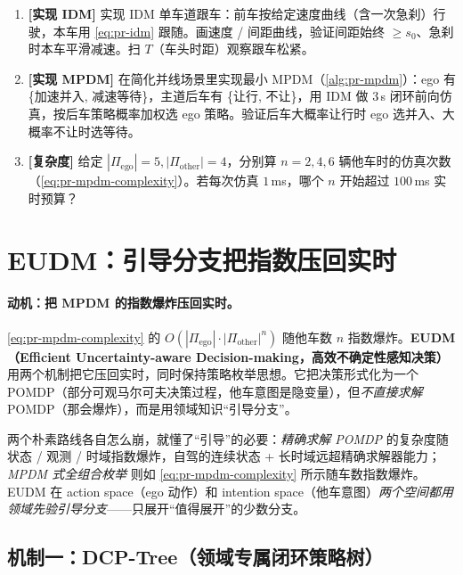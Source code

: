 \begin{practice}
\begin{enumerate}
  \item \textbf{[实现 IDM]} 实现 IDM 单车道跟车：前车按给定速度曲线（含一次急刹）行驶，本车用 \cref{eq:pr-idm} 跟随。画速度 / 间距曲线，验证间距始终 $\ge s_0$、急刹时本车平滑减速。扫 $T$（车头时距）观察跟车松紧。
  \item \textbf{[实现 MPDM]} 在简化并线场景里实现最小 MPDM（\cref{alg:pr-mpdm}）：ego 有 \{加速并入, 减速等待\}，主道后车有 \{让行, 不让\}，用 IDM 做 $3\,$s 闭环前向仿真，按后车策略概率加权选 ego 策略。验证后车大概率让行时 ego 选并入、大概率不让时选等待。
  \item \textbf{[复杂度]} 给定 $|\Pi_{\mathrm{ego}}|=5,|\Pi_{\mathrm{other}}|=4$，分别算 $n=2,4,6$ 辆他车时的仿真次数（\cref{eq:pr-mpdm-complexity}）。若每次仿真 $1\,$ms，哪个 $n$ 开始超过 $100\,$ms 实时预算？
\end{enumerate}
\end{practice}

\section{EUDM：引导分支把指数压回实时}
\label{sec:pr-eudm}

\paragraph{动机：把 MPDM 的指数爆炸压回实时。}
\cref{eq:pr-mpdm-complexity} 的 $O(|\Pi_{\mathrm{ego}}|\cdot|\Pi_{\mathrm{other}}|^n)$ 随他车数 $n$ 指数爆炸。\textbf{EUDM（Efficient Uncertainty-aware Decision-making，高效不确定性感知决策）}\cite{zhang2020eudm} 用两个机制把它压回实时，同时保持策略枚举思想。它把决策形式化为一个 POMDP（部分可观马尔可夫决策过程，他车意图是隐变量），但\emph{不直接求解} POMDP（那会爆炸），而是用领域知识“引导分支”。

两个朴素路线各自怎么崩，就懂了“引导”的必要：\emph{精确求解 POMDP} 的复杂度随状态 / 观测 / 时域指数爆炸，自驾的连续状态 + 长时域远超精确求解器能力；\emph{MPDM 式全组合枚举} 则如 \cref{eq:pr-mpdm-complexity} 所示随车数指数爆炸。EUDM 在 action space（ego 动作）和 intention space（他车意图）\emph{两个空间都用领域先验引导分支}——只展开“值得展开”的少数分支。

\subsection{机制一：DCP-Tree（领域专属闭环策略树）}
\label{sec:pr-eudm-dcp}

